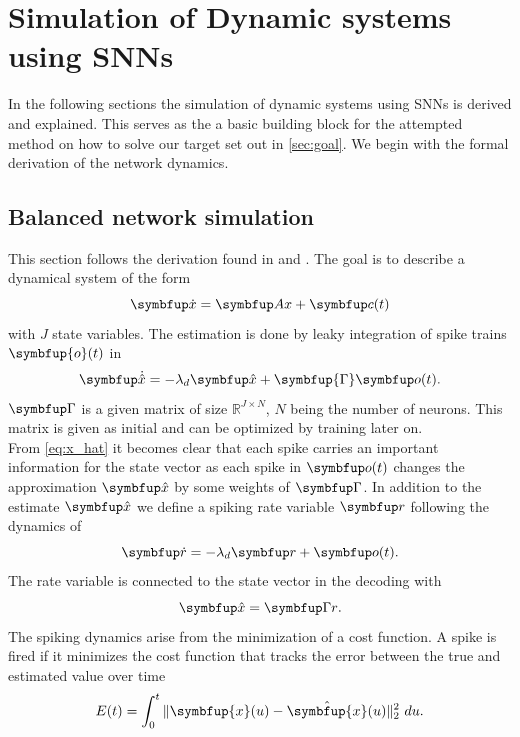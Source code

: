 \section{Simulation of Dynamic systems using \acp{SNN}}\label{sec:simulation}
In the following sections the simulation of dynamic systems using \acp{SNN} is derived and explained. This serves as the a basic building block for the attempted method on how to solve our target set out in \cref{sec:goal}. We begin with the formal derivation of the network dynamics.

\subsection{Balanced network simulation}\label{ssec:balanced_network_sim}

This section follows the derivation found in \cite{boerlin_predictive_2013} and \cite{huang_dynamics_2019}.
The goal is to describe a dynamical system of the form
\begin{equation}\label{eq:x}
\bmu{\dot{x}} = \bmu{Ax} + \bmu{c}(t)
\end{equation}
with $J$ state variables.
The estimation is done by leaky integration of spike trains $\symbfup{o}(t)$ in
\begin{equation}\label{eq:x_hat}
\bmu{\dot{\hat{x}}} = -\lambda_d \bmu{\hat{x}} + \symbfup{\Gamma} \bmu{o}(t).
\end{equation}
$\bmu{\Gamma}$ is a given matrix of size $\mathbb{R}^{J\times N}$, $N$ being the number of neurons. This matrix is given as initial and can be optimized by training later on\cite{brendel_learning_2020}.\\
From \cref{eq:x_hat} it becomes clear that each spike carries an important information for the state vector as each spike in $\bmu{o}(t)$ changes the approximation $\bmu{\hat{x}}$ by some weights of $\bmu{\Gamma}$.
In addition to the estimate $\bmu{\hat{x}}$ we define a spiking rate variable $\bmu{r}$ following the dynamics of
\begin{equation}\label{eq:rate}
\bmu{\dot{r}} = -\lambda_d\bmu{r} + \bmu{o}(t).
\end{equation}
The rate variable is connected to the state vector in the decoding with
\begin{equation}\label{eq:decoding}
	\bmu{\hat{x}} = \bmu{\Gamma r}.
\end{equation}
The spiking dynamics arise from the minimization of a cost function. A spike is fired if it minimizes the cost function that tracks the error between the true and estimated value over time
\begin{equation}\label{eq:cost_func_basic}
E(t)=\int_0^t \|\symbfup{x}(u)-\hat{\symbfup{x}}(u)\|_2^2 \ du.
\end{equation}


